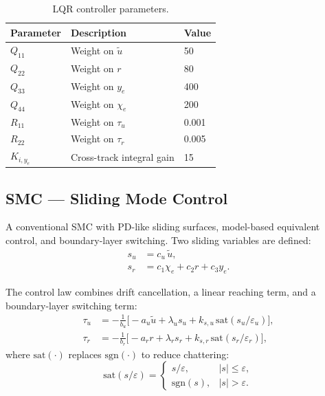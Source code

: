 \documentclass[review]{cas-dc}
\begin{document}
\begin{appendices}
\begin{table}[h]
\centering
\caption{LQR controller parameters.}
\label{tab:lqr_params}
\begin{tabular}{lll}
\toprule
Parameter & Description & Value \\
\midrule
$Q_{11}$ & Weight on $\tilde{u}$ & 50 \\
$Q_{22}$ & Weight on $r$ & 80 \\
$Q_{33}$ & Weight on $y_e$ & 400 \\
$Q_{44}$ & Weight on $\chi_e$ & 200 \\
$R_{11}$ & Weight on $\tau_u$ & 0.001 \\
$R_{22}$ & Weight on $\tau_r$ & 0.005 \\
$K_{i,y_e}$ & Cross-track integral gain & 15 \\
\bottomrule
\end{tabular}
\end{table}


\subsection{SMC --- Sliding Mode Control}
\label{sec:app_smc}

A conventional SMC with PD-like sliding surfaces, model-based equivalent control, and boundary-layer switching. Two sliding variables are defined:
\begin{align}
s_u &= c_u\,\tilde{u}, \label{eq:smc_su}\\
s_r &= c_1\chi_e + c_2 r + c_3 y_e. \label{eq:smc_sr}
\end{align}

The control law combines drift cancellation, a linear reaching term, and a boundary-layer switching term:
\begin{align}
\tau_u &= -\frac{1}{b_u}\Big[-a_u\tilde{u} + \lambda_u s_u + k_{s,u}\,\mathrm{sat}(s_u/\varepsilon_u)\Big], \label{eq:smc_tau_u}\\
\tau_r &= -\frac{1}{b_r}\Big[-a_r r + \lambda_r s_r + k_{s,r}\,\mathrm{sat}(s_r/\varepsilon_r)\Big], \label{eq:smc_tau_r}
\end{align}
where $\mathrm{sat}(\cdot)$ replaces $\mathrm{sgn}(\cdot)$ to reduce chattering:
\begin{equation}
\mathrm{sat}(s/\varepsilon) = \begin{cases} s/\varepsilon, & |s| \leq \varepsilon, \\ \mathrm{sgn}(s), & |s| > \varepsilon. \end{cases}
\label{eq:sat}
\end{equation}


\end{appendices}
\end{document}

